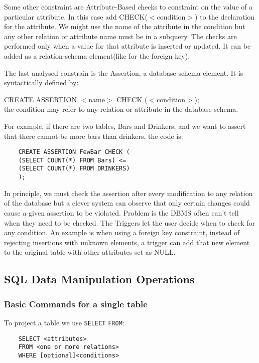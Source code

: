 \documentclass[a4page, 11pt]{article}
\theoremstyle{definition}
\begin{document}
Some other constraint are Attribute-Based checks to constraint on the value of a particular attribute. In this case add CHECK($<$condition$>$) to the declaration for the attribute. We might use the name of the attribute in the condition but any other relation or attribute name must be in a subquery.
The checks are performed only when a value for that attribute is inserted or updated.
It can be added as a relation-schema element(like for the foreign key). %

The last analysed constrain is the Assertion, a database-schema element. It is syntactically defined by: 

CREATE ASSERTION $<$name$>$ CHECK ($<$condition$>$);\\
 the condition may refer to any relation or attribute in the database schema.

For example, if there are two tables, Bars and Drinkers, and we want to assert that there cannot be more bars than drinkers, the code is:
\begin{lstlisting}
	CREATE ASSERTION FewBar CHECK (
	(SELECT COUNT(*) FROM Bars) <=
	(SELECT COUNT(*) FROM DRINKERS)
	);
\end{lstlisting}
In principle, we must check the assertion after every modification to any relation of the database but a clever system can observe that only certain changes could cause a given assertion to be violated. 
Problem is the DBMS often can't tell when they need to be checked. %
The Triggers let the user decide when to check for any condition.
An example is when using a foreign key constraint, instead of rejecting insertions with unknown elements, a trigger can add that new element to the original table with other attributes set as NULL.
\newpage
\subsection{SQL Data Manipulation Operations}

\subsubsection{Basic Commands for a single table}
To project a table we use \texttt{SELECT} \texttt{FROM}:

\begin{lstlisting}
	SELECT <attributes>
	FROM <one or more relations>
	WHERE [optional]<conditions>
\end{lstlisting}
\end{document}
